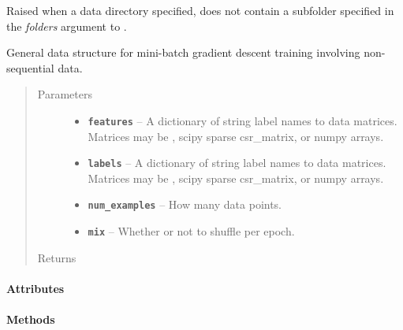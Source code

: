 \documentclass[letterpaper,10pt,english]{sphinxmanual}
\begin{document}
\begin{fulllineitems}
\label{loader:loader.Bad_directory_structure_error}
Raised when a data directory specified, does not contain a subfolder specified in the \emph{folders} argument to {\hyperref[loader:loader.read_data_sets]{\emph{}}}.

\end{fulllineitems}


\begin{fulllineitems}
\label{loader:loader.DataSet}
General data structure for mini-batch gradient descent training involving non-sequential data.
\begin{quote}\begin{description}
\item[{Parameters}] \leavevmode\begin{itemize}
\item {} 
\textbf{\texttt{features}} -- A dictionary of string label names to data matrices. Matrices may be {\hyperref[loader:loader.HotIndex]{\emph{}}}, scipy sparse csr\_matrix, or numpy arrays.

\item {} 
\textbf{\texttt{labels}} -- A dictionary of string label names to data matrices. Matrices may be {\hyperref[loader:loader.HotIndex]{\emph{}}}, scipy sparse csr\_matrix, or numpy arrays.

\item {} 
\textbf{\texttt{num\_examples}} -- How many data points.

\item {} 
\textbf{\texttt{mix}} -- Whether or not to shuffle per epoch.

\end{itemize}

\item[{Returns}] \leavevmode


\end{description}\end{quote}
\paragraph{Attributes}
\paragraph{Methods}


\end{fulllineitems}
\end{document}
